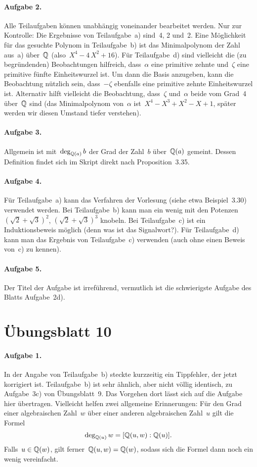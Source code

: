 \documentclass{../algblatt}
\begin{document}
\paragraph{Aufgabe 2.} Alle Teilaufgaben 
können unabhängig voneinander bearbeitet werden. Nur zur Kontrolle: Die
Ergebnisse von Teilaufgabe~a) sind~4, 2 und~2. Eine Möglichkeit für das
gesuchte Polynom in Teilaufgabe~b) ist das Minimalpolynom der Zahl aus~a)
über~$\mathbb{Q}$ (also~$X^4-4\,X^2+16$). Für Teilaufgabe~d) sind vielleicht die (zu begründenden)
Beobachtungen hilfreich, dass~$\alpha$ eine primitive zehnte und~$\zeta$ eine
primitive fünfte Einheitswurzel ist. Um dann die Basis anzugeben, kann die
Beobachtung nützlich sein, dass~$-\zeta$ ebenfalls eine primitive zehnte
Einheitswurzel ist. Alternativ hilft vielleicht die Beobachtung, dass~$\zeta$
und~$\alpha$ beide vom Grad~4 über~$\mathbb{Q}$ sind (das Minimalpolynom von~$\alpha$
ist~$X^4 - X^3 + X^2 - X + 1$, später werden wir diesen Umstand tiefer
verstehen).

\paragraph{Aufgabe 3.} Allgemein ist mit~$\deg_{\mathbb{Q}(a)} b$ der Grad der
Zahl~$b$ über~$\mathbb{Q}(a)$ gemeint. Dessen Definition findet sich im Skript direkt
nach Proposition~3.35.

\paragraph{Aufgabe 4.} Für Teilaufgabe~a) kann das Verfahren der
Vorlesung (siehe etwa Beispiel~3.30) verwendet werden. Bei Teilaufgabe~b) kann
man ein wenig mit den Potenzen~$(\sqrt{2}+\sqrt{3})^2$, $(\sqrt{2}+\sqrt{3})^3$
knobeln. Bei Teilaufgabe~c) ist
ein Induktionsbeweis möglich (denn was ist das Signalwort?). Für Teilaufgabe~d) kann man
das Ergebnis von Teilaufgabe~c) verwenden (auch ohne einen Beweis von~c) zu
kennen).

\paragraph{Aufgabe 5.} Der Titel der Aufgabe ist irreführend, vermutlich ist
die schwierigste Aufgabe des Blatts Aufgabe~2d).


\section*{Übungsblatt 10}

\paragraph{Aufgabe 1.} In der Angabe von Teilaufgabe~b) steckte kurzzeitig ein
Tippfehler, der jetzt korrigiert ist. Teilaufgabe~b) ist sehr ähnlich, aber nicht völlig
identisch, zu Aufgabe~3c) von Übungsblatt~9. Das Vorgehen dort lässt sich auf
die Aufgabe hier übertragen. Vielleicht helfen zwei allgemeine Erinnerungen:
Für den Grad einer algebraischen Zahl~$w$ über einer anderen algebraischen
Zahl~$u$ gilt die Formel
\[ \deg_{\mathbb{Q}(u)} w = [\mathbb{Q}(u,w):\mathbb{Q}(u)]. \]
Falls~$u \in \mathbb{Q}(w)$, gilt ferner~$\mathbb{Q}(u,w) = \mathbb{Q}(w)$, sodass sich die Formel
dann noch ein wenig vereinfacht.
\end{document}
